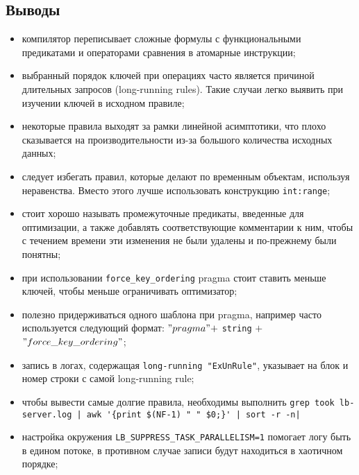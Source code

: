 \subsection{Выводы}
\label{sec:optimization:notes}

\begin{itemize}
  \item компилятор переписывает сложные формулы с функциональными предикатами и операторами сравнения в атомарные инструкции;
  \item выбранный порядок ключей при операциях \join часто является причиной длительных запросов (long-running rules). Такие случаи легко выявить при изучении ключей в исходном правиле;
  \item некоторые правила выходят за рамки линейной асимптотики, что плохо сказывается на производительности из-за большого количества исходных данных;
  \item следует избегать правил, которые делают \join по временным объектам, используя неравенства. Вместо этого лучше использовать конструкцию \lstinline{int:range};
  \item стоит хорошо называть промежуточные предикаты, введенные для оптимизации, а также добавлять соответствующие комментарии к ним, чтобы с течением времени эти изменения не были удалены и по-прежнему были понятны;
  \item при использовании \lstinline{force_key_ordering} pragma стоит ставить меньше ключей, чтобы меньше ограничивать оптимизатор;
  \item полезно придерживаться одного шаблона при pragma, например часто используется следующий формат: $"pragma" + $ \lstinline{string} $ +$\linebreak $ "force\_key\_ordering"$;
  \item запись в логах, содержащая \lstinline{long-running "ExUnRule"}, указывает на блок и номер строки с самой long-running rule;
  \item чтобы вывести самые долгие правила, необходимы выполнить \lstinline{grep took lb-server.log |}\lstinline| awk '{print $(NF-1) " " $0;}'|\lstinline{ | sort -r -n|}
  \item настройка окружения \lstinline{LB_SUPPRESS_TASK_PARALLELISM=1} помогает логу быть в едином потоке, в противном случае записи будут находиться в хаотичном порядке;
\end{itemize}
